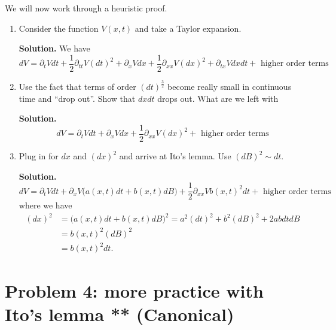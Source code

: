 \documentclass[11pt]{extarticle}
\theoremstyle{plain}
\theoremstyle{definition}
\begin{document}
\vspace{5mm}
\noindent
We will now work through a heuristic proof.
\begin{enumerate}
\item Consider the function $V(x, t)$ and take a Taylor expansion.

\vspace{5mm}
\noindent
\textbf{Solution.} We have 
\begin{equation*}
	dV = \partial_t V dt + \frac{1}{2} \partial_{tt} V (dt)^2 + \partial_x V dx + \frac{1}{2} \partial_{xx} V (dx)^2 + \partial_{tx} V dx dt + \text{ higher order terms}
\end{equation*}


\item Use the fact that terms of order $(dt)^\frac{3}{2}$ become really small in continuous time and ``drop out''. Show that $dx dt$ drops out. What are we left with

\vspace{5mm}
\noindent
\textbf{Solution.} 
\begin{equation*}
	dV = \partial_t V dt + \partial_x V dx + \frac{1}{2} \partial_{xx} V (dx)^2 + \text{ higher order terms}
\end{equation*}


\item Plug in for $dx$ and $(dx)^2$ and arrive at Ito's lemma. Use $(dB)^2 \sim dt$.

\vspace{5mm}
\noindent
\textbf{Solution.} 
\begin{equation*}
	dV = \partial_t V dt + \partial_x V \Big( a(x, t) dt + b(x, t) dB \Big) + \frac{1}{2} \partial_{xx} V b(x, t)^2 dt + \text{ higher order terms}
\end{equation*}
where we have
\begin{align*}
	(dx)^2 &= \Big( a(x, t) dt + b(x, t) dB \Big)^2 = a^2 (dt)^2 + b^2 (dB)^2 + 2 a b dt dB \\
	&= b(x, t)^2 (dB)^2 \\
	&= b(x, t)^2 dt.
\end{align*}
\end{enumerate}




\vspace{10mm}
\section*{Problem 4: more practice with Ito's lemma ** (Canonical)}
\end{document}
